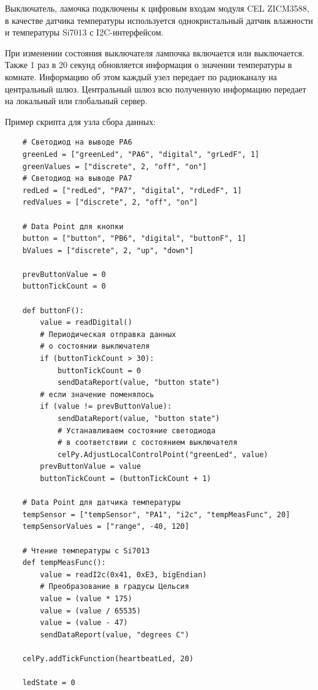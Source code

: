 \documentclass[12pt]{article}
\begin{document}
Выключатель, ламочка подключены к цифровым входам модуля CEL ZICM3588, в качестве
датчика температуры используется однокристальный датчик влажности и температуры
Si7013 с I2C-интерфейсом.

При изменении состояния выключателя лампочка включается или выключается. Также 1 раз в 20
секунд обновляется информация о значении температуры в комнате. Информацию об этом
каждый узел передает по радиоканалу на центральный шлюз. Центральный шлюз всю
полученную информацию передает на локальный или глобальный сервер.

Пример скрипта для узла сбора данных:
\begin{verbatim}
    # Светодиод на выводе PA6 
    greenLed = ["greenLed", "PA6", "digital", "grLedF", 1]
    greenValues = ["discrete", 2, "off", "on"]
    # Светодиод на выводе PA7 
    redLed = ["redLed", "PA7", "digital", "rdLedF", 1]
    redValues = ["discrete", 2, "off", "on"]
      
    # Data Point для кнопки
    button = ["button", "PB6", "digital", "buttonF", 1] 
    bValues = ["discrete", 2, "up", "down"] 
    
    prevButtonValue = 0
    buttonTickCount = 0 
      
    def buttonF():
        value = readDigital()
        # Периодическая отправка данных
        # о состоянии выключателя
        if (buttonTickCount > 30):
            buttonTickCount = 0
            sendDataReport(value, "button state")
        # если значение поменялось 
        if (value != prevButtonValue):  
            sendDataReport(value, "button state")
            # Устанавливаем состояние светодиода
            # в соответствии с состоянием выключателя
            celPy.AdjustLocalControlPoint("greenLed", value)    
        prevButtonValue = value
        buttonTickCount = (buttonTickCount + 1)
        
    # Data Point для датчика температуры
    tempSensor = ["tempSensor", "PA1", "i2c", "tempMeasFunc", 20]
    tempSensorValues = ["range", -40, 120]
    
    # Чтение температуры с Si7013
    def tempMeasFunc():
        value = readI2c(0x41, 0xE3, bigEndian)
        # Преобразование в градусы Цельсия
        value = (value * 175)
        value = (value / 65535)
        value = (value - 47)
        sendDataReport(value, "degrees C")
    
    celPy.addTickFunction(heartbeatLed, 20) 
      
    ledState = 0
      

\end{verbatim}
\end{document}
